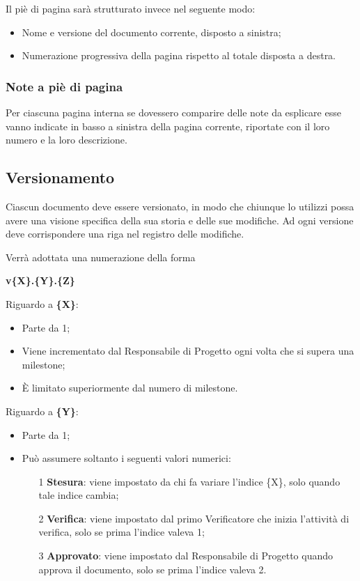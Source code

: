 	Il piè di pagina sarà strutturato invece nel seguente modo:
	
	\begin{itemize}
	
		\item Nome e versione del documento corrente, disposto a sinistra;
		\item Numerazione progressiva della pagina rispetto al totale disposta a destra.
	
	\end{itemize}
	
	\subsubsection{Note a piè di pagina}
	
	Per ciascuna pagina interna se dovessero comparire delle note da esplicare esse vanno indicate in basso a sinistra della pagina corrente, riportate con il loro numero e la loro descrizione.

\subsection{Versionamento}

Ciascun documento deve essere versionato, in modo che chiunque lo utilizzi possa avere una visione specifica della sua storia e delle sue modifiche. Ad ogni versione deve corrispondere una riga nel registro delle modifiche.

Verrà adottata una numerazione della forma
\begin{center}
 \textbf{v\{X\}.\{Y\}.\{Z\}}
\end{center}

Riguardo a \textbf{\{X\}}:
\begin{itemize}
 \item Parte da 1;
 \item Viene incrementato dal Responsabile di Progetto ogni volta che si supera una milestone;
 \item È limitato superiormente dal numero di milestone.
\end{itemize}

Riguardo a \textbf{\{Y\}}:
\begin{itemize}
 \item Parte da 1;
 \item Può assumere soltanto i seguenti valori numerici:
 \begin{enumerate}
  \item[1] \textbf{Stesura}: viene impostato da chi fa variare l'indice \{X\}, solo quando tale indice cambia;
  \item[2] \textbf{Verifica}: viene impostato dal primo Verificatore che inizia l'attività di verifica, solo se prima l'indice valeva 1;
  \item[3] \textbf{Approvato}: viene impostato dal Responsabile di Progetto quando approva il documento, solo se prima l'indice valeva 2.
 \end{enumerate}
\end{itemize}

